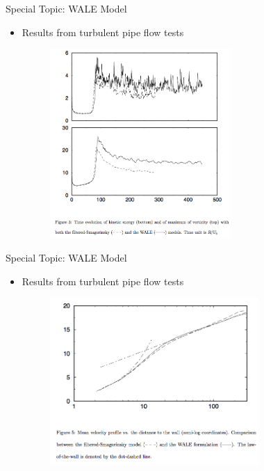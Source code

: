 \begin{frame}{Special Topic: WALE Model}
\begin{itemize}
	\item Results from turbulent pipe flow tests
	\begin{figure}
		\includegraphics[width=0.65\textwidth]{wale3}
	\end{figure}
\end{itemize}
\end{frame}
\begin{frame}{Special Topic: WALE Model}
\begin{itemize}
	\item Results from turbulent pipe flow tests
	\begin{figure}
		\includegraphics[width=0.75\textwidth]{wale4}
	\end{figure}
\end{itemize}
\end{frame}
